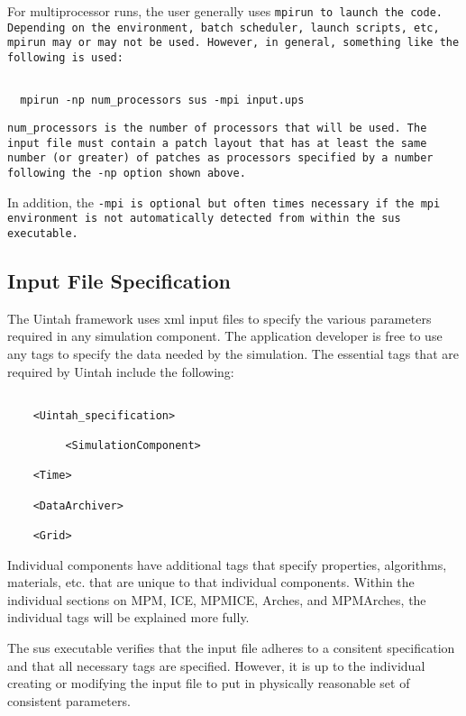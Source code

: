 For multiprocessor runs, the user generally uses \tt mpirun
\normalfont to launch the code.  Depending on the environment, batch
scheduler, launch scripts, etc, \tt mpirun \normalfont may or may not
be used.  However, in general, something like the following is used:
\begin{Verbatim}[fontsize=\footnotesize]

  mpirun -np num_processors sus -mpi input.ups

\end{Verbatim}

\tt num\_processors \normalfont is the number of processors that will
be used.  The input file must contain a patch layout that has at least
the same number (or greater) of patches as processors specified by a
number following the -np option shown above.

In addition, the \tt -mpi \normalfont is optional but often times
necessary if the mpi environment is not automatically detected from
within the sus executable.
 

\subsection{Input File Specification} \label{Sec:InputFileSpecification}

The Uintah framework uses xml input files to specify the various
parameters required in any simulation component.  The application
developer is free to use any tags to specify the data needed by the
simulation.  The essential tags that are required by Uintah include
the following:

\begin{verbatim}

	<Uintah_specification>

         <SimulationComponent>

	<Time>

	<DataArchiver>

	<Grid>

\end{verbatim}


Individual components have additional tags that specify properties,
algorithms, materials, etc. that are unique to that individual
components.  Within the individual sections on MPM, ICE, MPMICE,
Arches, and MPMArches, the individual tags will be explained more
fully.  

The sus executable verifies that the input file adheres to a consitent
specification and that all necessary tags are specified.  However, it
is up to the individual creating or modifying the input file to put in
physically reasonable set of consistent parameters.


